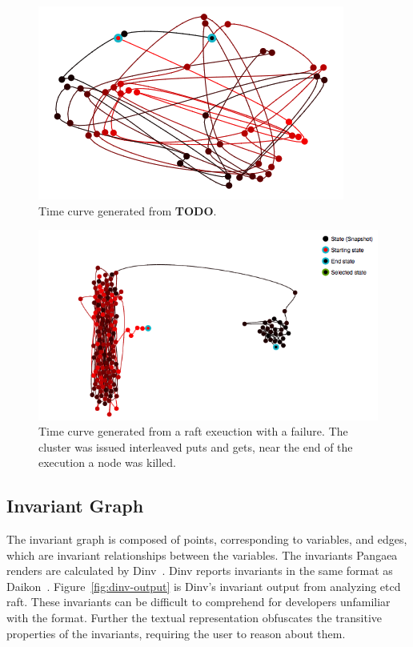 \begin{figure}[h]
    \includegraphics[width=\linewidth]{fig/linear-server}%
    \caption{Time curve generated from \textbf{TODO}. \label{fig:linear-server}}%
\end{figure}

\begin{figure}[h]
    \includegraphics[width=\linewidth]{fig/put-get-fail}%
    \caption{Time curve generated from a raft exeuction with a failure. The cluster was issued interleaved puts and gets, near the end of the execution a node was killed.\label{fig:put-get-fail}}%
\end{figure}

\subsection{Invariant Graph}
\label{sec:invariant-graph}

The invariant graph is composed of points, corresponding to variables,
and edges, which are invariant relationships between the variables.
The invariants Pangaea renders are calculated by Dinv~\cite{dinv}.
Dinv reports invariants in the same format as Daikon~\cite{Ernst01}.
Figure~\ref{fig:dinv-output} is Dinv's invariant output from analyzing
etcd raft. These invariants can be difficult to comprehend for
developers unfamiliar with the format. Further the textual representation
obfuscates the transitive properties of the invariants, requiring the
user to reason about them.


